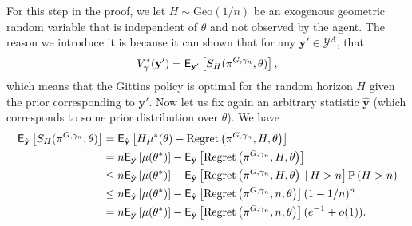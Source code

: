 \begin{myproof}[Proof.]
	For this step in the proof, we let $H \sim \text{Geo}(1/n)$ be an exogenous geometric random variable that is independent of $\theta$ and not observed by the agent. The reason we introduce it is because it can shown that for any $ {\mathbf y}' \in \mathcal{Y}^A$, that
	\[
	V_\gamma^*(\mathbf y') = \mathsf{E}_{\mathbf y'}\left[ S_H(\pi^{G,\gamma_n}, \theta) \right],
	\]
	which means that the Gittins policy is optimal for the random horizon $H$ given the prior corresponding to ${\mathbf y}'$. Now let us fix again an arbitrary statistic $\hat{\mathbf y}$ (which corresponds to some prior distribution over $\theta$). We  have
	\begin{align}
\mathsf{E}_{\hat{\mathbf y}}\left[S_H(\pi^{G, \gamma_n}, \theta)\right] & =  \mathsf{E}_{\hat{\mathbf y}}\left[H \mu^*(\theta) -\textnormal{Regret} \left( \pi^{G,\gamma_n}, H, \theta \right)\right] \\
	& =  n \mathsf{E}_{\hat{\mathbf y}}\left[\mu(\theta^*)\right] - \mathsf{E}_{\hat{\mathbf y}}\left[\textnormal{Regret} \left( \pi^{G, \gamma_n}, H, \theta \right)\right] \nonumber \\
	& \le n \mathsf{E}_{\hat{\mathbf y}}\left[\mu(\theta^*)\right] - \mathsf{E}_{\hat{\mathbf y}}\left[\textnormal{Regret} \left( \pi^{G, \gamma_n}, H, \theta \right) \:\vert\: H > n\right]\mathbb{P} \left( H > n \right) \nonumber \\
	& \le n \mathsf{E}_{\hat{\mathbf y}}\left[\mu(\theta^*)\right]  - \mathsf{E}_{\hat{\mathbf y}}\left[\textnormal{Regret} \left( \pi^{G, \gamma_n}, n, \theta \right)\right](1-1/n)^n \nonumber \\
	& = n \mathsf{E}_{\hat{\mathbf y}}\left[\mu(\theta^*)\right] - \mathsf{E}_{\hat{\mathbf y}}\left[\textnormal{Regret} \left( \pi^{G, \gamma_n}, n, \theta \right)\right](e^{-1} + o(1)) \label{bound:geometric_regret1}.
	\end{align}
	

\end{myproof}

